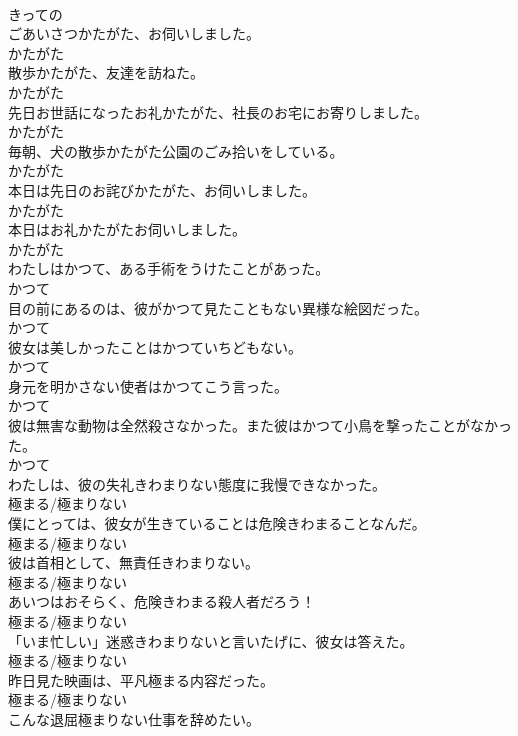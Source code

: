 \documentclass[8pt]{extreport}
\begin{document}
\begin{CJK}{UTF8}{min}
\\	きっての	
\\	ごあいさつかたがた、お伺いしました。	
\\	かたがた	
\\	散歩かたがた、友達を訪ねた。	
\\	かたがた	
\\	先日お世話になったお礼かたがた、社長のお宅にお寄りしました。	
\\	かたがた	
\\	毎朝、犬の散歩かたがた公園のごみ拾いをしている。	
\\	かたがた	
\\	本日は先日のお詫びかたがた、お伺いしました。	
\\	かたがた	
\\	本日はお礼かたがたお伺いしました。	
\\	かたがた	
\\	わたしはかつて、ある手術をうけたことがあった。	
\\	かつて	
\\	目の前にあるのは、彼がかつて見たこともない異様な絵図だった。	
\\	かつて	
\\	彼女は美しかったことはかつていちどもない。	
\\	かつて	
\\	身元を明かさない使者はかつてこう言った。	
\\	かつて	
\\	彼は無害な動物は全然殺さなかった。また彼はかつて小鳥を撃ったことがなかった。	
\\	かつて	
\\	わたしは、彼の失礼きわまりない態度に我慢できなかった。	
\\	極まる/極まりない	
\\	僕にとっては、彼女が生きていることは危険きわまることなんだ。	
\\	極まる/極まりない	
\\	彼は首相として、無責任きわまりない。	
\\	極まる/極まりない	
\\	あいつはおそらく、危険きわまる殺人者だろう！	
\\	極まる/極まりない	
\\	「いま忙しい」迷惑きわまりないと言いたげに、彼女は答えた。	
\\	極まる/極まりない	
\\	昨日見た映画は、平凡極まる内容だった。	
\\	極まる/極まりない	
\\	こんな退屈極まりない仕事を辞めたい。	

\end{CJK}
\end{document}
